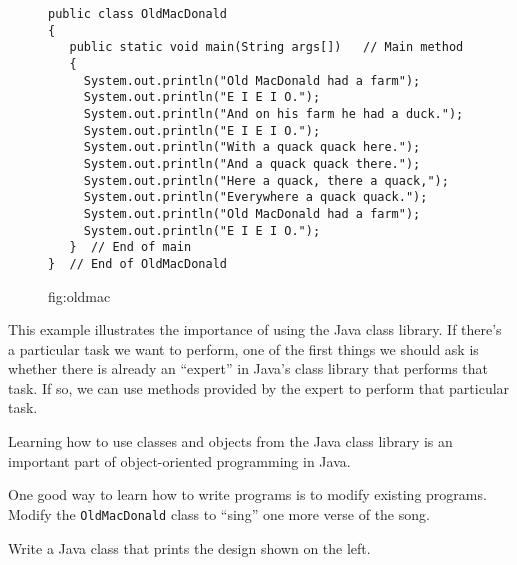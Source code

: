 \begin{figure}[h]
\jjjprogstart
\begin{jjjlisting}
\begin{lstlisting}
public class OldMacDonald
{
   public static void main(String args[])   // Main method
   {
     System.out.println("Old MacDonald had a farm");
     System.out.println("E I E I O.");
     System.out.println("And on his farm he had a duck.");
     System.out.println("E I E I O.");
     System.out.println("With a quack quack here.");
     System.out.println("And a quack quack there.");
     System.out.println("Here a quack, there a quack,");
     System.out.println("Everywhere a quack quack.");
     System.out.println("Old MacDonald had a farm");
     System.out.println("E I E I O.");
   }  // End of main
}  // End of OldMacDonald
\end{lstlisting}
\end{jjjlisting}
{fig:oldmac}

\end{figure}

This example illustrates the importance of using the Java class
library.  If there's a particular task we want to perform, one of the
first things we should ask is whether there is already an ``expert''
in Java's class library that performs that task.  If so, we can use
methods provided by the expert to perform that particular task.

 {Learning how to use
classes and objects from the Java class library is an important
part of object-oriented programming in Java.}

\begin{SSTUDY}
\marginnote{\small\tt
**********\\
\mbox{*}\mbox{ }**\mbox{ }\mbox{ }**\mbox{ }*\\
\mbox{*}\mbox{ }\mbox{ }\mbox{ }**\mbox{ }\mbox{ }\mbox{ }*\\
\mbox{*}\mbox{ }*\mbox{ }\mbox{ }\mbox{ }\mbox{ }*\mbox{ }*\\
\mbox{*}\mbox{ }\mbox{ }****\mbox{ }\mbox{ }*\\
\mbox{*}*********
}

\item One good way to learn how to write programs is to modify existing
programs.   Modify the {\tt OldMacDonald} class to ``sing'' one more
verse of the song.

\item Write a Java class that prints the design shown on the left.

\end{SSTUDY}

